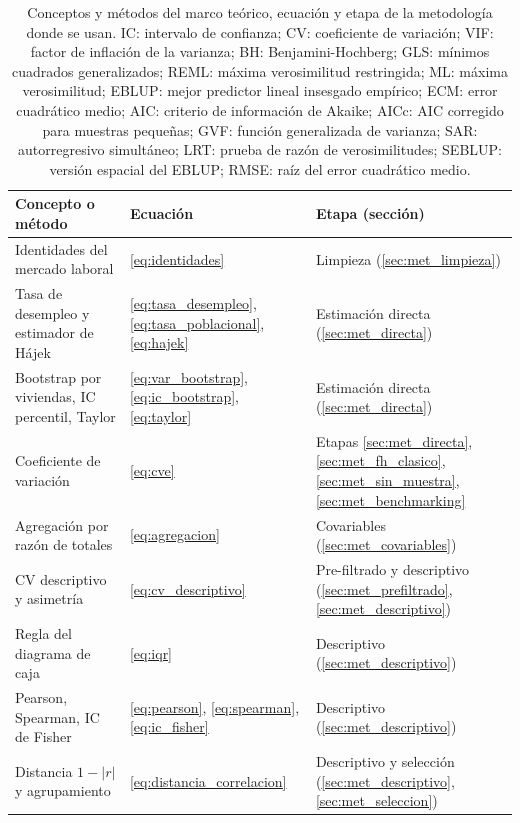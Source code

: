 \begin{table}[!htbp]
\centering
\footnotesize
\caption{Conceptos y métodos del marco teórico, ecuación y etapa de la metodología donde se usan. IC: intervalo de confianza; CV: coeficiente de variación; VIF: factor de inflación de la varianza; BH: Benjamini-Hochberg; GLS: mínimos cuadrados generalizados; REML: máxima verosimilitud restringida; ML: máxima verosimilitud; EBLUP: mejor predictor lineal insesgado empírico; ECM: error cuadrático medio; AIC: criterio de información de Akaike; AICc: AIC corregido para muestras pequeñas; GVF: función generalizada de varianza; SAR: autorregresivo simultáneo; LRT: prueba de razón de verosimilitudes; SEBLUP: versión espacial del EBLUP; RMSE: raíz del error cuadrático medio.}
\label{tab:conceptos_etapas}
\renewcommand{\arraystretch}{1.0}
\begin{tabularx}{\linewidth}{>{\raggedright\arraybackslash}X >{\raggedright\arraybackslash}p{3.2cm} >{\raggedright\arraybackslash}p{4.6cm}}
\toprule
Concepto o método & Ecuación & Etapa (sección) \\
\midrule
Identidades del mercado laboral & \ref{eq:identidades} & Limpieza (\ref{sec:met_limpieza}) \\
Tasa de desempleo y estimador de Hájek & \ref{eq:tasa_desempleo}, \ref{eq:tasa_poblacional}, \ref{eq:hajek} & Estimación directa (\ref{sec:met_directa}) \\
Bootstrap por viviendas, IC percentil, Taylor & \ref{eq:var_bootstrap}, \ref{eq:ic_bootstrap}, \ref{eq:taylor} & Estimación directa (\ref{sec:met_directa}) \\
Coeficiente de variación & \ref{eq:cve} & Etapas \ref{sec:met_directa}, \ref{sec:met_fh_clasico}, \ref{sec:met_sin_muestra}, \ref{sec:met_benchmarking} \\
Agregación por razón de totales & \ref{eq:agregacion} & Covariables (\ref{sec:met_covariables}) \\
CV descriptivo y asimetría & \ref{eq:cv_descriptivo} & Pre-filtrado y descriptivo (\ref{sec:met_prefiltrado}, \ref{sec:met_descriptivo}) \\
Regla del diagrama de caja & \ref{eq:iqr} & Descriptivo (\ref{sec:met_descriptivo}) \\
Pearson, Spearman, IC de Fisher & \ref{eq:pearson}, \ref{eq:spearman}, \ref{eq:ic_fisher} & Descriptivo (\ref{sec:met_descriptivo}) \\
Distancia $1-|r|$ y agrupamiento & \ref{eq:distancia_correlacion} & Descriptivo y selección (\ref{sec:met_descriptivo}, \ref{sec:met_seleccion}) \\

\end{tabularx}
\end{table}
